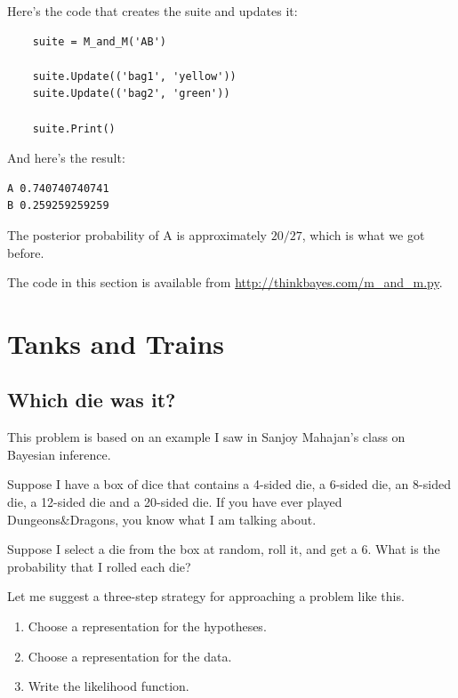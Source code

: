 \documentclass[12pt]{book}
\begin{document}
Here's the code that creates the suite and updates it:

\begin{verbatim}
    suite = M_and_M('AB')

    suite.Update(('bag1', 'yellow'))
    suite.Update(('bag2', 'green'))

    suite.Print()
\end{verbatim}

And here's the result:

\begin{verbatim}
A 0.740740740741
B 0.259259259259
\end{verbatim}

The posterior probability of A is approximately $20/27$, which
is what we got before.

The code in this section is available from
\url{http://thinkbayes.com/m_and_m.py}.


\chapter{Tanks and Trains}

\section{Which die was it?}

This problem is based on an example I saw in Sanjoy Mahajan's class
on Bayesian inference.

Suppose I have a box of dice that contains a 4-sided die, a 6-sided
die, an 8-sided die, a 12-sided die and a 20-sided die.  If you
have ever played Dungeons\&Dragons, you know what I am talking about.

Suppose I select a die from the box at random, roll it, and get a 6.
What is the probability that I rolled each die?

Let me suggest a three-step strategy for approaching a problem like this.

\begin{enumerate}

\item Choose a representation for the hypotheses.

\item Choose a representation for the data.

\item Write the likelihood function.

\end{enumerate}
\end{document}

